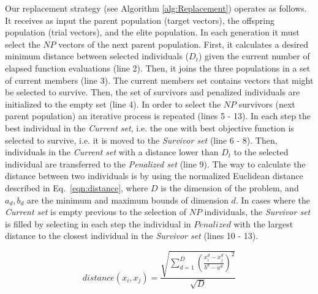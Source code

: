 Our replacement strategy (see Algorithm \ref{alg:Replacement}) operates as follows.
%
It receives as input the parent population (target vectors), the offspring population (trial vectors), and the elite population.
%
In each generation it must select the $NP$ vectors of the next parent population.
%
First, it calculates a desired minimum distance between selected individuals ($D_t$) given the current number of elapsed function evaluations (line 2).
%
Then, it joins the three populations in a set of current members (line 3).
%
The current members set contains vectors that might be selected to survive.
%
Then, the set of survivors and penalized individuals are initialized to the empty set (line 4).
%
In order to select the $NP$ survivors (next parent population) an iterative process is repeated (lines 5 - 13).
%
In each step the best individual in the \textit{Current set}, i.e. the one with best objective function is selected
to survive, i.e. it is moved to the \textit{Survivor set} (line 6 - 8).
%
Then, individuals in the \textit{Current set} with a distance lower than $D_t$ to the selected individual are transferred to the \textit{Penalized set} (line 9).
%
The way to calculate the distance between two individuals is by using the normalized Euclidean distance described in Eq.~\ref{eqn:distance}, where $D$ is the dimension of the problem, and $a_d, b_d$ are the minimum and maximum bounds of dimension $d$.
%
%
In cases where the \textit{Current set} is empty previous to the selection of $NP$ individuals, the \textit{Survivor set} is filled by selecting in each step 
the individual in $Penalized$ with the largest distance to the closest individual in the \textit{Survivor set} (lines 10 - 13).

\begin{equation}\label{eqn:distance}
distance ( x_{i}, x_j ) = \frac{\sqrt{ \sum_{d=1}^D \left ( \frac{x_{i}^d - x_j^d}{b^d - a^d} \right )^2  }} {\sqrt{D}}
\end{equation}


